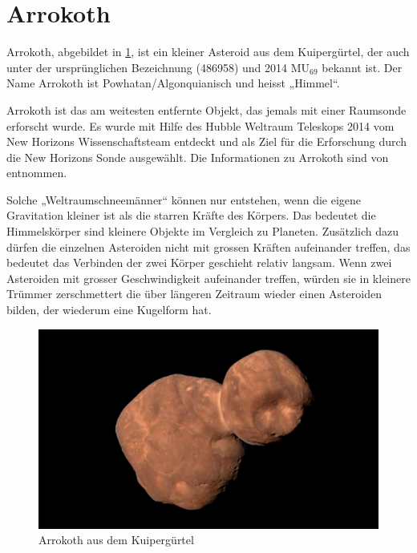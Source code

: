 %
%
%
%
\section{Arrokoth
\label{planet:section:arrokoth}}

Arrokoth, abgebildet in \cref{planet:fig:arrokoth}, ist ein kleiner Asteroid aus dem Kuipergürtel, der auch unter der ursprünglichen Bezeichnung (486958) und 2014 \(\text{MU}_{69}\) bekannt ist.
Der Name Arrokoth ist Powhatan/Algonquianisch und heisst „Himmel“.

Arrokoth ist das am weitesten entfernte Objekt, das jemals mit einer Raumsonde erforscht wurde.
Es wurde mit Hilfe des Hubble Weltraum Teleskops 2014 vom New Horizons Wissenschaftsteam entdeckt und als Ziel für die Erforschung durch die New Horizons Sonde ausgewählt.
Die Informationen zu Arrokoth sind von \cite{planet:arrokoth} entnommen.

Solche „Weltraumschneemänner“ können nur entstehen, wenn die eigene Gravitation kleiner ist als die starren Kräfte des Körpers.
Das bedeutet die Himmelskörper sind kleinere Objekte im Vergleich zu Planeten.
Zusätzlich dazu dürfen die einzelnen Asteroiden nicht mit grossen Kräften aufeinander treffen, das bedeutet das Verbinden der zwei Körper geschieht relativ langsam.
Wenn zwei Asteroiden mit grosser Geschwindigkeit aufeinander treffen, würden sie in kleinere Trümmer zerschmettert die über längeren Zeitraum wieder einen Asteroiden bilden, der wiederum eine Kugelform hat.

\begin{figure}[h]
    \centering
    \includegraphics[width=\linewidth]{papers/planet/pictures/Arrokoth.pdf}
    \caption{Arrokoth aus dem Kuipergürtel \cite{planet:arrokothpic}
        \label{planet:fig:arrokoth}}
\end{figure}